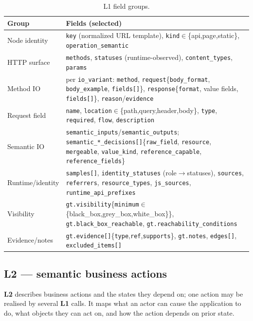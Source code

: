 \documentclass[11pt,a4paper]{article}
\newcommand{\cd}[1]{\lstinline[basicstyle=\ttfamily\small]|#1|}
\renewcommand{\L}[1]{\textbf{L#1}}
\begin{document}
\begin{table}[ht]\centering\small
\caption{L1 field groups.}\label{tab:l1}
\begin{tabularx}{\textwidth}{@{}l>{\raggedright\arraybackslash}X@{}}
\toprule
\textbf{Group} & \textbf{Fields (selected)}\\
\midrule
Node identity   & \cd{key} (normalized URL template), \cd{kind}$\in$\{api,page,static\}, \cd{operation_semantic}\\
HTTP surface    & \cd{methods}, \cd{statuses} (runtime-observed), \cd{content_types}, \cd{params}\\
Method IO       & per \cd{io_variant}: \cd{method}, \cd{request}\{\cd{body_format}, \cd{body_example}, \cd{fields[]}\}, \cd{response}\{\cd{format}, value fields, \cd{fields[]}\}, \cd{reason}/\cd{evidence}\\
Request field   & \cd{name}, \cd{location}$\in$\{path,query,header,body\}, \cd{type}, \cd{required}, \cd{flow}, \cd{description}\\
Semantic IO     & \cd{semantic_inputs}/\cd{semantic_outputs}; \cd{semantic_*_decisions[]}\{\cd{raw_field}, \cd{resource}, \cd{mergeable}, \cd{value_kind}, \cd{reference_capable}, \cd{reference_fields}\}\\
Runtime/identity& \cd{samples[]}, \cd{identity_statuses} (role$\to$statuses), \cd{sources}, \cd{referrers}, \cd{resource_types}, \cd{js_sources}, \cd{runtime_api_prefixes}\\
Visibility      & \cd{gt.visibility}\{\cd{minimum}$\in$\{black\_box,grey\_box,white\_box\}\}, \cd{gt.black_box_reachable}, \cd{gt.reachability_conditions}\\
Evidence/notes  & \cd{gt.evidence[]}\{\cd{type},\cd{ref},\cd{supports}\}, \cd{gt.notes}, \cd{edges[]}, \cd{excluded_items[]}\\
\bottomrule
\end{tabularx}
\end{table}

\subsection{L2 --- semantic business actions}
\L2 describes business actions and the states they depend on; one action may be realised
by several \L1 calls. It maps what an actor can cause the application to do, what objects
they can act on, and how the action depends on prior state.
\end{document}
